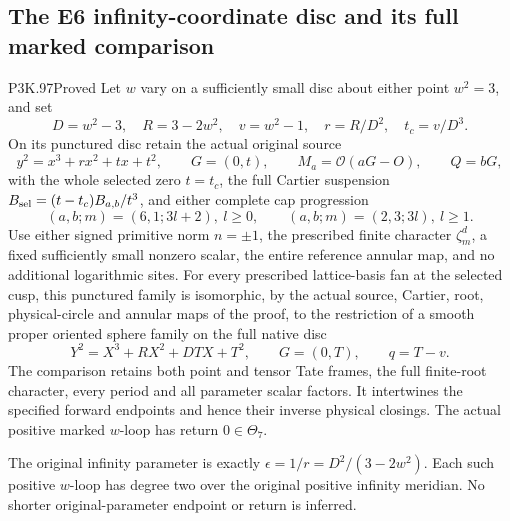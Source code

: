 \subsection{The E6 infinity-coordinate disc and its full marked comparison}
\begin{statement}{P3K.97}{Proved}
Let \(w\) vary on a sufficiently small disc about either point \(w^2=3\), and set
\[
 D=w^2-3,\quad R=3-2w^2,\quad v=w^2-1,\quad
 r=R/D^2,\quad t_c=v/D^3.
\]
On its punctured disc retain the actual original source
\[
 y^2=x^3+r x^2+t x+t^2,\qquad G=(0,t),\qquad
 M_a=\mathcal O(aG-O),\qquad Q=bG,
\]
with the whole selected zero \(t=t_c\), the full Cartier suspension
\(B_{\rm sel}=(t-t_c)B_{a,b}/t^3\), and either complete cap progression
\[
 (a,b;m)=(6,1;3l+2),\ l\ge0,\qquad
 (a,b;m)=(2,3;3l),\ l\ge1.
\]
Use either signed primitive norm \(n=\pm1\), the prescribed finite
character \(\zeta_m^d\), a fixed sufficiently small nonzero scalar,
the entire reference annular map, and no additional logarithmic
sites. For every prescribed lattice-basis fan at the selected cusp,
this punctured family is isomorphic, by the actual source, Cartier,
root, physical-circle and annular maps of the proof, to the restriction
of a smooth proper oriented sphere family on the full native disc
\[
 Y^2=X^3+R X^2+DTX+T^2,\qquad G=(0,T),\qquad q=T-v.
\]
The comparison retains both point and tensor Tate frames, the full
finite-root character, every period and all parameter scalar factors.
It intertwines the specified forward endpoints and hence their inverse
physical closings. The actual positive marked \(w\)-loop has return
\(0\in\Theta_7\).

The original infinity parameter is exactly
\(\epsilon=1/r=D^2/(3-2w^2)\). Each such positive \(w\)-loop
has degree two over the original positive infinity meridian.
No shorter original-parameter endpoint or return is inferred.
\end{statement}
